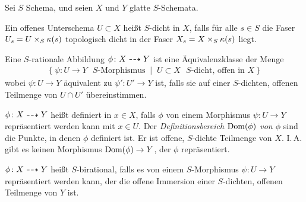 \documentclass[german]{scrreprt}
\begin{document}
\begin{Definition}\label{def:ratabb}
  \cite[Chapter 2.5]{neron}
  Sei $S$ Schema, und seien $X$ und $Y$ glatte $S$-Schemata.

  Ein offenes Unterschema $U\subset X$ heißt $S$-dicht in $X$, falls
  für alle $s\in S$ die Faser $U_s=U\times_S\kappa(s)$ topologisch dicht
  in der Faser $X_s=X\times_S\kappa(s)$ liegt.

  Eine $S$-rationale Abbildung $\phi\colon X\dashrightarrow Y$ ist eine
  Äquivalenzklasse der Menge
  \begin{gather*}
    \left\{
      \psi\colon U\to Y \text{ $S$-Morphismus}
      \;\middle|\;
      U\subset X \text{ $S$-dicht, offen in $X$}
    \right\}
  \end{gather*}
  wobei $\psi\colon U\to Y$ äquivalent zu $\psi'\colon U'\to Y$ ist,
  falls sie auf einer $S$-dichten, offenen Teilmenge von $U\cap U'$
  übereinstimmen.

  $\phi\colon X\dashrightarrow Y$ heißt definiert in $x\in X$, falls $\phi$ von
  einem Morphismus $\psi\colon U\to Y$ repräsentiert werden kann mit
  $x\in U$.
  Der \emph{Definitionsbereich $\operatorname{Dom}(\phi)$ von $\phi$} sind die
  Punkte, in denen $\phi$ definiert ist. Er ist offene, $S$-dichte
  Teilmenge von $X$. I.\,A. gibt es keinen Morphismus $\operatorname{Dom}(\phi)\to
  Y$, der $\phi$ repräsentiert.

  $\phi\colon X\dashrightarrow Y$ heißt $S$-birational, falls es von einem
  $S$-Morphismus $\psi\colon U\to Y$ repräsentiert werden kann, der
  die offene Immersion einer $S$-dichten, offenen Teilmenge von $Y$
  ist.
\end{Definition}


\nocite{*}
\printbibliography
\end{document}
